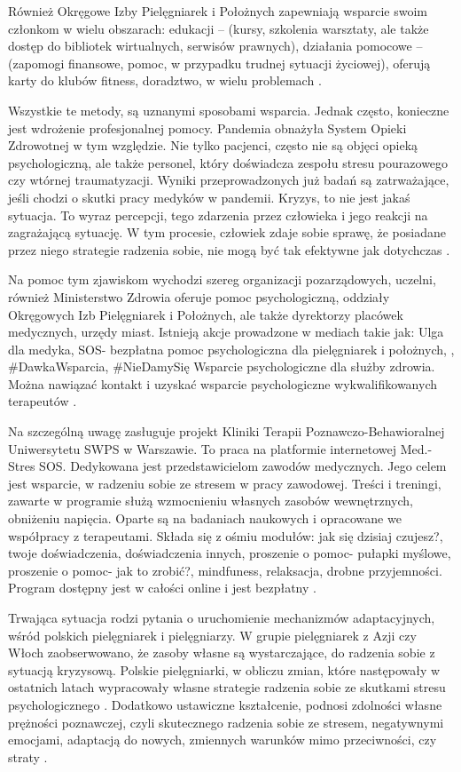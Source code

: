 \documentclass[a4paper,12pt,twoside,openany]{report}
\begin{document}
Również Okręgowe Izby Pielęgniarek i Położnych zapewniają wsparcie swoim członkom w wielu obszarach: edukacji – (kursy, szkolenia warsztaty, ale także dostęp do bibliotek wirtualnych, serwisów prawnych), działania pomocowe – (zapomogi finansowe, pomoc, w przypadku trudnej sytuacji życiowej), oferują karty do klubów fitness, doradztwo, w wielu problemach \cite{izby}.

Wszystkie te metody, są uznanymi sposobami wsparcia. Jednak często, konieczne jest wdrożenie profesjonalnej pomocy. Pandemia obnażyła System Opieki Zdrowotnej w tym względzie. Nie tylko pacjenci, często nie są objęci opieką psychologiczną, ale także personel, który doświadcza zespołu stresu pourazowego czy wtórnej traumatyzacji.  Wyniki przeprowadzonych już badań są zatrważające, jeśli chodzi o skutki pracy medyków w pandemii. Kryzys, to nie jest jakaś sytuacja. To wyraz percepcji, tego zdarzenia przez człowieka i jego reakcji na zagrażającą sytuację. W tym procesie, człowiek zdaje sobie sprawę, że posiadane przez niego strategie radzenia sobie, nie mogą być tak efektywne jak dotychczas \cite{covid}.

Na pomoc tym zjawiskom wychodzi szereg organizacji pozarządowych, uczelni, również Ministerstwo Zdrowia oferuje pomoc psychologiczną, oddziały Okręgowych Izb Pielęgniarek i Położnych, ale także dyrektorzy placówek medycznych, urzędy miast. Istnieją akcje prowadzone w mediach takie jak: Ulga dla medyka, SOS- bezpłatna pomoc psychologiczna dla pielęgniarek i położnych, , \#DawkaWsparcia, \#NieDamySię Wsparcie psychologiczne dla służby zdrowia. Można nawiązać kontakt i uzyskać wsparcie psychologiczne wykwalifikowanych terapeutów \cite{jak}.

Na szczególną uwagę zasługuje projekt Kliniki Terapii Poznawczo-Behawioralnej Uniwersytetu SWPS w Warszawie. To praca na platformie internetowej Med.-Stres SOS. Dedykowana jest przedstawicielom zawodów medycznych. Jego celem jest wsparcie, w radzeniu sobie ze stresem w pracy zawodowej. Treści i treningi, zawarte w programie służą wzmocnieniu własnych zasobów wewnętrznych, obniżeniu napięcia. Oparte są na badaniach naukowych i opracowane we współpracy z terapeutami. Składa się z ośmiu modułów: jak się dzisiaj czujesz?, twoje doświadczenia, doświadczenia innych, proszenie o pomoc- pułapki myślowe, proszenie o pomoc- jak to zrobić?, mindfuness, relaksacja, drobne przyjemności. Program dostępny jest w całości online i jest bezpłatny \cite {projekt}.

Trwająca sytuacja rodzi pytania o uruchomienie mechanizmów adaptacyjnych, wśród polskich pielęgniarek i pielęgniarzy. W grupie pielęgniarek z Azji czy Włoch zaobserwowano, że zasoby własne są wystarczające, do radzenia sobie z sytuacją kryzysową. Polskie pielęgniarki, w obliczu zmian, które następowały w ostatnich latach wypracowały własne strategie radzenia sobie ze skutkami stresu psychologicznego \cite{covid}. Dodatkowo ustawiczne kształcenie, podnosi zdolności własne prężności poznawczej, czyli skutecznego radzenia sobie ze stresem, negatywnymi emocjami, adaptacją do nowych, zmiennych warunków mimo przeciwności, czy straty \cite{prężność}. 
 
\end{document}
